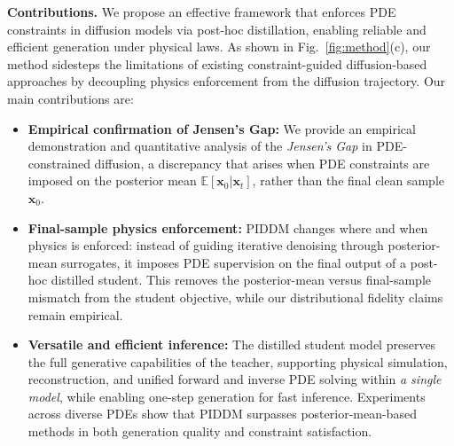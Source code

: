 \documentclass{article}
\theoremstyle{plain}
\theoremstyle{definition}
\theoremstyle{remark}
\def\vx{{\bm{x}}}
\begin{document}
\noindent\textbf{Contributions.}
We propose an effective framework that enforces PDE constraints in diffusion models via post-hoc distillation, enabling reliable and efficient generation under physical laws. As shown in Fig.~\ref{fig:method}(c), our method sidesteps the limitations of existing constraint-guided diffusion-based approaches by decoupling physics enforcement from the diffusion trajectory. Our main contributions are:

\begin{itemize}[leftmargin=*, nosep]
\item \textbf{Empirical confirmation of Jensen’s Gap:} We provide an empirical demonstration and quantitative analysis of the \textit{Jensen’s Gap} in PDE-constrained diffusion, a discrepancy that arises when PDE constraints are imposed on the posterior mean $\mathbb{E}[\vx_0 | \vx_t]$, rather than the final clean sample $\vx_0$.

\item \textbf{Final-sample physics enforcement:} PIDDM changes where and when physics is enforced: instead of guiding iterative denoising through posterior-mean surrogates, it imposes PDE supervision on the final output of a post-hoc distilled student. This removes the posterior-mean versus final-sample mismatch from the student objective, while our distributional fidelity claims remain empirical.

\item \textbf{Versatile and efficient inference:} The distilled student model preserves the full generative capabilities of the teacher, supporting physical simulation, reconstruction, and unified forward and inverse PDE solving within \emph{a single model}, while enabling one-step generation for fast inference. Experiments across diverse PDEs show that PIDDM surpasses posterior-mean-based methods \cite{huang2024diffusionpde, cheng2025eci, bastek2025pdim, jacobsen2024cocogen} in both generation quality and constraint satisfaction.
\end{itemize}
\end{document}
